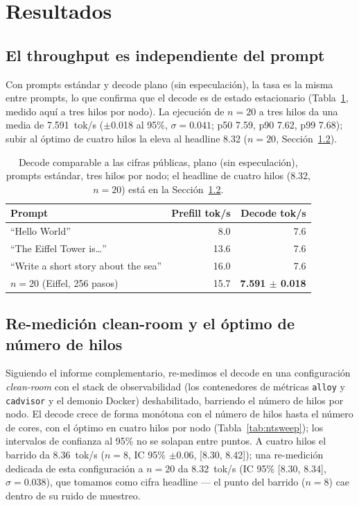 \documentclass[10pt,a4paper]{article}
\begin{document}
\section{Resultados}
\label{sec:results}

\subsection{El throughput es independiente del prompt}
Con prompts estándar y decode plano (sin especulación), la tasa es la misma entre prompts, lo que confirma que el decode es de estado estacionario (Tabla~\ref{tab:headline}, medido aquí a tres hilos por nodo). La ejecución de $n{=}20$ a tres hilos da una media de 7.591~tok/s ($\pm$0.018 al 95\%, $\sigma=0.041$; p50 7.59, p90 7.62, p99 7.68); subir al óptimo de cuatro hilos la eleva al headline 8.32 ($n{=}20$, Sección~\ref{sec:cleanroom}).

\begin{table}[H]
\centering\small
\caption{Decode comparable a las cifras públicas, plano (sin especulación), prompts estándar, tres hilos por nodo; el headline de cuatro hilos (8.32, $n{=}20$) está en la Sección~\ref{sec:cleanroom}.}
\label{tab:headline}
\begin{tabular}{@{}lrr@{}}
\toprule
\textbf{Prompt} & \textbf{Prefill tok/s} & \textbf{Decode tok/s} \\
\midrule
``Hello World'' & 8.0 & 7.6 \\
``The Eiffel Tower is\ldots'' & 13.6 & 7.6 \\
``Write a short story about the sea'' & 16.0 & 7.6 \\
\midrule
$n{=}20$ (Eiffel, 256 pasos) & 15.7 & \textbf{7.591 $\pm$ 0.018} \\
\bottomrule
\end{tabular}
\end{table}

\subsection{Re-medición clean-room y el óptimo de número de hilos}
\label{sec:cleanroom}
Siguiendo el informe complementario, re-medimos el decode en una configuración \emph{clean-room} con el stack de observabilidad (los contenedores de métricas \texttt{alloy} y \texttt{cadvisor} y el demonio Docker) deshabilitado, barriendo el número de hilos por nodo. El decode crece de forma monótona con el número de hilos hasta el número de cores, con el óptimo en cuatro hilos por nodo (Tabla~\ref{tab:ntsweep}); los intervalos de confianza al 95\% no se solapan entre puntos. A cuatro hilos el barrido da 8.36~tok/s ($n{=}8$, IC 95\% $\pm$0.06, [8.30, 8.42]); una re-medición dedicada de esta configuración a $n{=}20$ da 8.32~tok/s (IC 95\% [8.30, 8.34], $\sigma=0.038$), que tomamos como cifra headline --- el punto del barrido ($n{=}8$) cae dentro de su ruido de muestreo.
\end{document}
